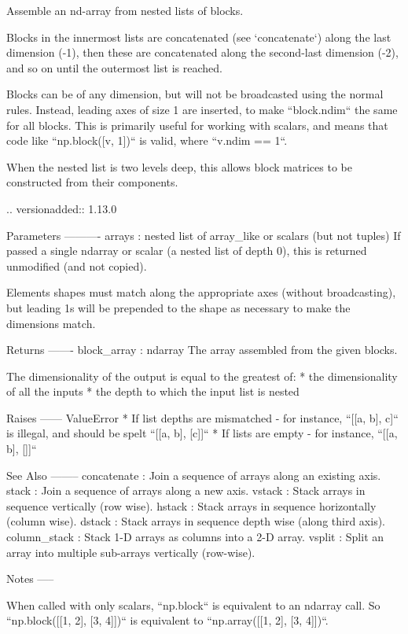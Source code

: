 \begin{DoxyVerb}Assemble an nd-array from nested lists of blocks.

Blocks in the innermost lists are concatenated (see `concatenate`) along
the last dimension (-1), then these are concatenated along the
second-last dimension (-2), and so on until the outermost list is reached.

Blocks can be of any dimension, but will not be broadcasted using the normal
rules. Instead, leading axes of size 1 are inserted, to make ``block.ndim``
the same for all blocks. This is primarily useful for working with scalars,
and means that code like ``np.block([v, 1])`` is valid, where
``v.ndim == 1``.

When the nested list is two levels deep, this allows block matrices to be
constructed from their components.

.. versionadded:: 1.13.0

Parameters
----------
arrays : nested list of array_like or scalars (but not tuples)
    If passed a single ndarray or scalar (a nested list of depth 0), this
    is returned unmodified (and not copied).

    Elements shapes must match along the appropriate axes (without
    broadcasting), but leading 1s will be prepended to the shape as
    necessary to make the dimensions match.

Returns
-------
block_array : ndarray
    The array assembled from the given blocks.

    The dimensionality of the output is equal to the greatest of:
    * the dimensionality of all the inputs
    * the depth to which the input list is nested

Raises
------
ValueError
    * If list depths are mismatched - for instance, ``[[a, b], c]`` is
      illegal, and should be spelt ``[[a, b], [c]]``
    * If lists are empty - for instance, ``[[a, b], []]``

See Also
--------
concatenate : Join a sequence of arrays along an existing axis.
stack : Join a sequence of arrays along a new axis.
vstack : Stack arrays in sequence vertically (row wise).
hstack : Stack arrays in sequence horizontally (column wise).
dstack : Stack arrays in sequence depth wise (along third axis).
column_stack : Stack 1-D arrays as columns into a 2-D array.
vsplit : Split an array into multiple sub-arrays vertically (row-wise).

Notes
-----

When called with only scalars, ``np.block`` is equivalent to an ndarray
call. So ``np.block([[1, 2], [3, 4]])`` is equivalent to
``np.array([[1, 2], [3, 4]])``.


\end{DoxyVerb}
